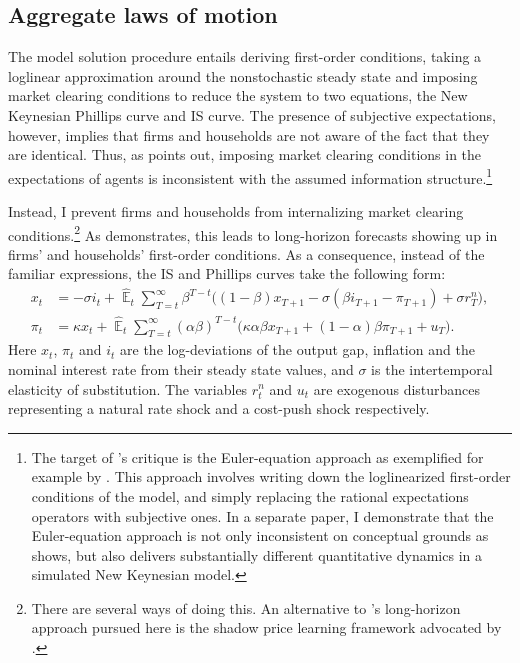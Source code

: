 \documentclass[11pt]{article}
\renewcommand{\[}{\begin{equation}}
\renewcommand{\]}{\end{equation}}
\DeclareMathOperator{\E}{\mathbb{E}}
\begin{document}
\subsection{Aggregate laws of motion}\label{FOCs}
The model solution procedure entails deriving first-order conditions, taking a loglinear approximation around the nonstochastic steady state and imposing market clearing conditions to reduce the system to two equations, the New Keynesian Phillips curve and IS curve. The presence of subjective expectations, however, implies that firms and households are not aware of the fact that they are identical. Thus, as \cite{preston2005} points out, imposing market clearing conditions in the expectations of agents is inconsistent with the assumed information structure.\footnote{The target of \cite{preston2005}'s critique is the Euler-equation approach as exemplified for example by \cite{bullard2002learning}. This approach involves writing down the loglinearized first-order conditions of the model, and simply replacing the rational expectations operators with subjective ones. In a separate paper, I demonstrate that the Euler-equation approach is not only inconsistent on conceptual grounds as \cite{preston2005} shows, but also delivers substantially different quantitative dynamics in a simulated New Keynesian model.} 

Instead, I prevent firms and households from internalizing market clearing conditions.\footnote{There are several ways of doing this. An alternative to \cite{preston2005}'s long-horizon approach pursued here is the shadow price learning framework advocated by \cite{evans2009SP}.} As \cite{preston2005} demonstrates, this leads to long-horizon forecasts showing up in firms' and households' first-order conditions. As a consequence, instead of the familiar expressions, the IS and Phillips curves take the following form:
 \begin{align}
x_t &=  -\sigma i_t +\hat{\E}_t \sum_{T=t}^{\infty} \beta^{T-t }\big( (1-\beta)x_{T+1} - \sigma(\beta i_{T+1} - \pi_{T+1}) +\sigma r_T^n \big)  \label{NKIS},  \\
\pi_t &= \kappa x_t +\hat{\E}_t \sum_{T=t}^{\infty} (\alpha\beta)^{T-t }\big( \kappa \alpha \beta x_{T+1} + (1-\alpha)\beta \pi_{T+1} + u_T\big) \label{NKPC}. 
\end{align}
Here $x_t$, $\pi_t$ and $i_t$ are the log-deviations of the output gap, inflation and the nominal interest rate from their steady state values, and $\sigma$ is the intertemporal elasticity of substitution. The variables $r_t^n$ and $u_t$ are exogenous disturbances representing a natural rate shock and a cost-push shock respectively. 
\end{document}
